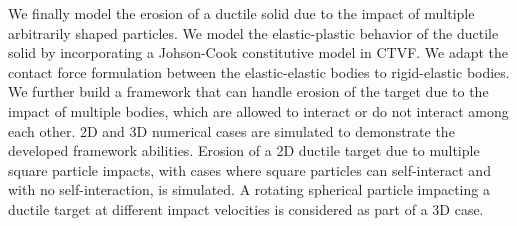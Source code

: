 \begin{Abstract}
  We finally model the erosion of a ductile solid due to the impact of multiple
  arbitrarily shaped particles. We model the elastic-plastic behavior of the
  ductile solid by incorporating a Johson-Cook constitutive model in CTVF. We
  adapt the contact force formulation between the elastic-elastic bodies to
  rigid-elastic bodies. We further build a framework that can handle erosion of
  the target due to the impact of multiple bodies, which are allowed to interact
  or do not interact among each other. 2D and 3D numerical cases are simulated
  to demonstrate the developed framework abilities. Erosion of a 2D ductile
  target due to multiple square particle impacts, with cases where square
  particles can self-interact and with no self-interaction, is simulated. A
  rotating spherical particle impacting a ductile target at different impact
  velocities is considered as part of a 3D case.

%
%
%
%
%
\end{Abstract}
